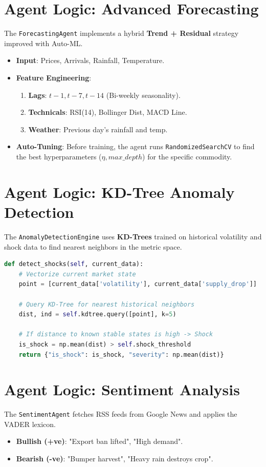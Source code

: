 \documentclass[a4paper,12pt]{report}
\begin{document}
\section{Agent Logic: Advanced Forecasting}
The \texttt{ForecastingAgent} implements a hybrid \textbf{Trend + Residual} strategy improved with Auto-ML.
\begin{itemize}
    \item \textbf{Input}: Prices, Arrivals, Rainfall, Temperature.
    \item \textbf{Feature Engineering}:
    \begin{enumerate}
        \item \textbf{Lags}: $t-1, t-7, t-14$ (Bi-weekly seasonality).
        \item \textbf{Technicals}: RSI(14), Bollinger Dist, MACD Line.
        \item \textbf{Weather}: Previous day's rainfall and temp.
    \end{enumerate}
    \item \textbf{Auto-Tuning}:
    Before training, the agent runs \texttt{RandomizedSearchCV} to find the best hyperparameters ($\eta, max\_depth$) for the specific commodity.
\end{itemize}

\section{Agent Logic: KD-Tree Anomaly Detection}
The \texttt{AnomalyDetectionEngine} uses \textbf{KD-Trees} trained on historical volatility and shock data to find nearest neighbors in the metric space.
\begin{lstlisting}[language=Python]
def detect_shocks(self, current_data):
    # Vectorize current market state
    point = [current_data['volatility'], current_data['supply_drop']]
    
    # Query KD-Tree for nearest historical neighbors
    dist, ind = self.kdtree.query([point], k=5)
    
    # If distance to known stable states is high -> Shock
    is_shock = np.mean(dist) > self.shock_threshold
    return {"is_shock": is_shock, "severity": np.mean(dist)}
\end{lstlisting}

\section{Agent Logic: Sentiment Analysis}
The \texttt{SentimentAgent} fetches RSS feeds from Google News and applies the VADER lexicon.
\begin{itemize}
    \item \textbf{Bullish (+ve)}: "Export ban lifted", "High demand".
    \item \textbf{Bearish (-ve)}: "Bumper harvest", "Heavy rain destroys crop".
\end{itemize}
\end{document}
